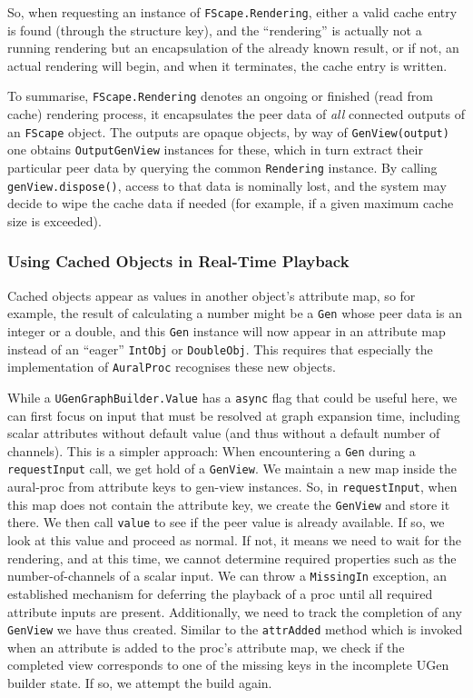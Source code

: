 \documentclass[11pt,a4paper]{article}
\begin{document}
So, when requesting an instance of \Verb!FScape.Rendering!, either a valid cache entry is found (through the structure key), and the ``rendering'' is actually not a running rendering but an encapsulation of the already known result, or if not, an actual rendering will begin, and when it terminates, the cache entry is written.

To summarise, \Verb!FScape.Rendering! denotes an ongoing or finished (read from cache) rendering process, it encapsulates the peer data of \emph{all} connected outputs of an \Verb!FScape! object. The outputs are opaque objects, by way of \Verb!GenView(output)! one obtains \Verb!OutputGenView! instances for these, which in turn extract their particular peer data by querying the common \Verb!Rendering! instance. By calling \Verb!genView.dispose()!, access to that data is nominally lost, and the system may decide to wipe the cache data if needed (for example, if a given maximum cache size is exceeded).

\subsubsection{Using Cached Objects in Real-Time Playback}

Cached objects appear as values in another object's attribute map, so for example, the result of calculating a number might be a \Verb!Gen! whose peer data is an integer or a double, and this \Verb!Gen! instance will now appear in an attribute map instead of an ``eager'' \Verb!IntObj! or \Verb!DoubleObj!. This requires that especially the implementation of \Verb!AuralProc! recognises these new objects.

While a \Verb!UGenGraphBuilder.Value! has a \verb!async! flag that could be useful here, we can first focus on input that must be resolved at graph expansion time, including scalar attributes without default value (and thus without a default number of channels). This is a simpler approach: When encountering a \Verb!Gen! during a \Verb!requestInput! call, we get hold of a \Verb!GenView!. We maintain a new map inside the aural-proc from attribute keys to gen-view instances. So, in \verb!requestInput!, when this map does not contain the attribute key, we create the \Verb!GenView! and store it there. We then call \Verb!value! to see if the peer value is already available. If so, we look at this value and proceed as normal. If not, it means we need to wait for the rendering, and at this time, we cannot determine required properties such as the number-of-channels of a scalar input. We can throw a \Verb!MissingIn! exception, an established mechanism for deferring the playback of a proc until all required attribute inputs are present. Additionally, we need to track the completion of any \Verb!GenView! we have thus created. Similar to the \verb!attrAdded! method which is invoked when an attribute is added to the proc's attribute map, we check if the completed view corresponds to one of the missing keys in the incomplete UGen builder state. If so, we attempt the build again.
\end{document}
